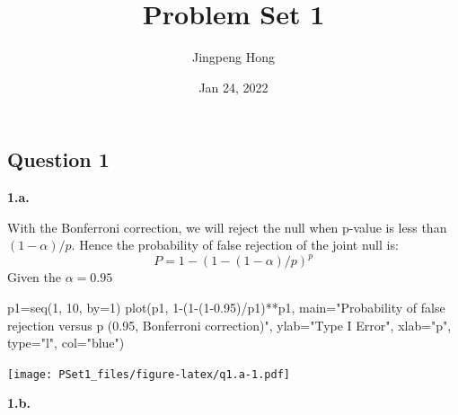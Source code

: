 \documentclass[
]{article}
\title{Problem Set 1}
\author{Jingpeng Hong}
\date{Jan 24, 2022}
\newenvironment{Shaded}{\begin{snugshade}}{\end{snugshade}}
\newcommand{\AttributeTok}[1]{\textcolor[rgb]{0.77,0.63,0.00}{#1}}
\newcommand{\DecValTok}[1]{\textcolor[rgb]{0.00,0.00,0.81}{#1}}
\newcommand{\FloatTok}[1]{\textcolor[rgb]{0.00,0.00,0.81}{#1}}
\newcommand{\FunctionTok}[1]{\textcolor[rgb]{0.00,0.00,0.00}{#1}}
\newcommand{\NormalTok}[1]{#1}
\newcommand{\OtherTok}[1]{\textcolor[rgb]{0.56,0.35,0.01}{#1}}
\newcommand{\SpecialCharTok}[1]{\textcolor[rgb]{0.00,0.00,0.00}{#1}}
\newcommand{\StringTok}[1]{\textcolor[rgb]{0.31,0.60,0.02}{#1}}
\begin{document}
\maketitle

\hypertarget{question-1}{%
\subsection{Question 1}\label{question-1}}

\textbf{1.a.}

With the Bonferroni correction, we will reject the null when p-value is
less than \((1-\alpha)/p\). Hence the probability of false rejection of
the joint null is: \[P=1-(1-(1-\alpha)/p)^p\] Given the
\(\alpha = 0.95\)

\begin{Shaded}
\begin{Highlighting}[]
\NormalTok{p1}\OtherTok{=}\FunctionTok{seq}\NormalTok{(}\DecValTok{1}\NormalTok{, }\DecValTok{10}\NormalTok{, }\AttributeTok{by=}\DecValTok{1}\NormalTok{)}
\FunctionTok{plot}\NormalTok{(p1, }\DecValTok{1}\SpecialCharTok{{-}}\NormalTok{(}\DecValTok{1}\SpecialCharTok{{-}}\NormalTok{(}\DecValTok{1}\FloatTok{{-}0.95}\NormalTok{)}\SpecialCharTok{/}\NormalTok{p1)}\SpecialCharTok{**}\NormalTok{p1,}
\AttributeTok{main=}\StringTok{"Probability of false rejection versus p (0.95, Bonferroni correction)"}\NormalTok{, }\AttributeTok{ylab=}\StringTok{"Type I Error"}\NormalTok{, }\AttributeTok{xlab=}\StringTok{"p"}\NormalTok{, }\AttributeTok{type=}\StringTok{"l"}\NormalTok{, }\AttributeTok{col=}\StringTok{"blue"}\NormalTok{)}
\end{Highlighting}
\end{Shaded}

\texttt{[image: PSet1\_files/figure-latex/q1.a-1.pdf]}

\textbf{1.b.}
\end{document}
